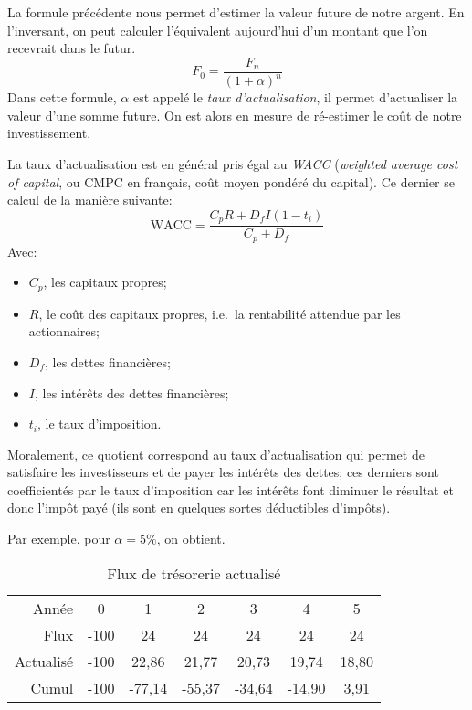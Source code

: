 La formule précédente nous permet d'estimer la valeur future 
de notre argent. En l'inversant, on peut calculer l'équivalent 
aujourd'hui d'un montant que l'on recevrait dans le futur.
\[ F_0 = \frac{F_n}{(1+\alpha)^n} \]
Dans cette formule, $\alpha$ est appelé le \emph{taux 
d'actualisation}, il permet d'actualiser la valeur d'une somme future.
On est alors en mesure de ré-estimer le coût de notre 
investissement.

La taux d'actualisation est en général pris égal au \emph{WACC} (\textit{weighted average cost of capital}, ou 
CMPC en français, coût moyen pondéré du capital).
Ce dernier se calcul de la manière suivante:
\begin{equation*}
\label{eq:WACC}
\mathrm{WACC} = \frac{C_p R + D_f I (1- t_i) }{C_p + D_f}
\end{equation*}
Avec:
\begin{itemize}
  \item $C_p$, les capitaux propres;
  \item $R$, le coût des capitaux propres, i.e.\ la rentabilité attendue par les actionnaires;
  \item $D_f$, les dettes financières;
  \item $I$, les intérêts des dettes financières;
  \item $t_i$, le taux d'imposition.
\end{itemize}

Moralement, ce quotient correspond au taux d'actualisation 
qui permet de satisfaire les investisseurs et de payer les 
intérêts des dettes; ces derniers sont coefficientés 
par le taux d'imposition car les intérêts font diminuer 
le résultat et donc l'impôt payé (ils sont en quelques sortes 
déductibles d'impôts).

Par exemple, pour $\alpha = 5\%$, on obtient.

\begin{table}[h]
\small
\centering
\begin{tabular}{|r|c|c|c|c|c|c|}
\hline
 Année & 0 & 1 & 2 & 3 & 4 & 5 \\
 Flux  & -100 & 24 & 24 & 24 & 24 & 24 \\
 Actualisé & -100 & 22,86 & 21,77 & 20,73 & 19,74 & 18,80 \\
 Cumul & -100 & -77,14 & -55,37 & -34,64 & -14,90 & 3,91 \\
\hline
\end{tabular}
\caption{Flux de trésorerie actualisé}
\end{table}

